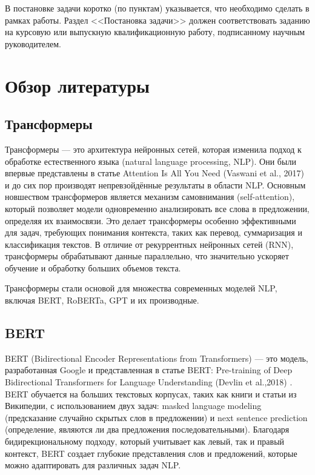 \documentclass[14pt]{mmcs_article}
\begin{document}
В постановке задачи коротко (по пунктам) указывается, что необходимо сделать в рамках работы. Раздел <<Постановка задачи>> должен соответствовать заданию на курсовую или выпускную квалификационную работу, подписанному научным руководителем.


\newpage
{}
\section*{Обзор литературы}\label{literature_review}

\subsection*{Трансформеры}\label{transformers}

Трансформеры — это архитектура нейронных сетей, которая изменила подход к обработке естественного языка (natural language processing, NLP). Они были впервые представлены в статье Attention Is All You Need (Vaswani et al., 2017) \cite{vaswani2023attentionneed} и до сих пор производят непревзойдённые результаты в области NLP. Основным новшеством трансформеров является механизм самовнимания (self-attention), который позволяет модели одновременно анализировать все слова в предложении, определяя их взаимосвязи. Это делает трансформеры особенно эффективными для задач, требующих понимания контекста, таких как перевод, суммаризация и классификация текстов. В отличие от рекуррентных нейронных сетей (RNN), трансформеры обрабатывают данные параллельно, что значительно ускоряет обучение и обработку больших объемов текста.

Трансформеры стали основой для множества современных моделей NLP, включая BERT, RoBERTa, GPT и их производные.

\subsection*{BERT}\label{bert}

BERT (Bidirectional Encoder Representations from Transformers) --- это модель, разработанная Google и представленная в статье BERT: Pre-training of Deep Bidirectional Transformers for Language Understanding (Devlin et al.,2018) \cite{devlin2019bertpretrainingdeepbidirectional}. BERT обучается на больших текстовых корпусах, таких как книги и статьи из Википедии, с использованием двух задач: masked language modeling (предсказание случайно скрытых слов в предложении) и next sentence prediction (определение, являются ли два предложения последовательными). Благодаря бидирекциональному подходу, который учитывает как левый, так и правый контекст, BERT создает глубокие представления слов и предложений, которые можно адаптировать для различных задач NLP.
\end{document}
